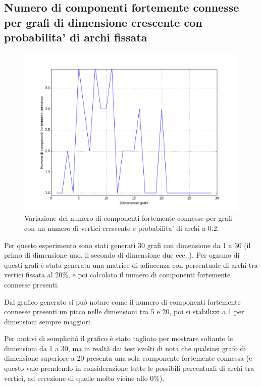 \documentclass[a4paper,12pt]{article}
\begin{document}
\subsection{Numero di componenti fortemente connesse per grafi di dimensione crescente con probabilita' di archi fissata}
\begin{figure}[h]
    \centering
    \captionsetup{justification=centering,margin=1cm}
    \includegraphics[width=1.0\textwidth]{test1}
    \caption{Variazione del numero di componenti fortemente connesse per grafi con un numero di vertici crescente e probabilita' di archi a 0.2.}
    \label{fig:test1}
\end{figure}

Per questo esperimento sono stati generati 30 grafi con dimensione da 1 a 30 (il primo di dimensione uno, il secondo di dimensione due ecc..). Per ognuno di questi grafi è stata generata una matrice di adiacenza con percentuale di archi tra vertici fissata al 20\%, e poi calcolato il numero di componenti fortemente connesse presenti.
\newline

Dal grafico generato si può notare come il numero di componenti fortemente connesse presenti un picco nelle dimensioni tra 5 e 20, poi si stabilizzi a 1 per dimensioni sempre maggiori.
\newline

Per motivi di semplicità il grafico è stato tagliato per mostrare soltanto le dimensioni da 1 a 30, ma in realtà dai test svolti di nota che qualsiasi grafo di dimensione superiore a 20 presenta una sola componente fortemente connessa (e questo vale prendendo in considerazione tutte le possibili percentuali di archi tra vertici, ad eccezione di quelle molto vicine allo 0\%).
\newline
\end{document}
